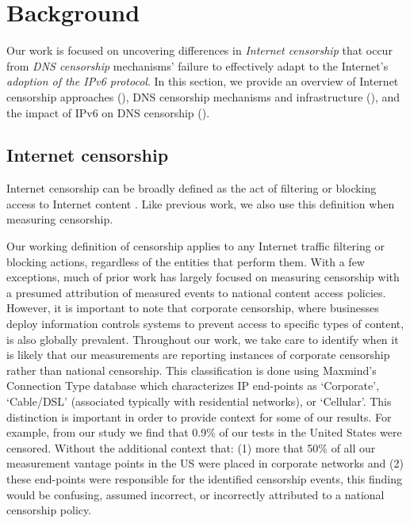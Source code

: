 \section{Background}\label{sec:background}
Our work is focused on uncovering differences in {\em Internet censorship} that occur
from {\em DNS censorship} mechanisms' failure to effectively adapt to the Internet's
{\em adoption of the IPv6 protocol}. In this section, we provide an overview of
Internet censorship approaches (), DNS
censorship mechanisms and infrastructure (), and the
impact of IPv6 on DNS censorship ().

\subsection{Internet censorship}\label{sec:background:censorship}

Internet censorship can be broadly defined as the act of filtering or blocking
access to Internet content \cite{townsend}. Like previous work, we also use
this definition when measuring censorship.

Our working definition of censorship applies to any Internet traffic filtering
or blocking actions, regardless of the entities that perform them. With a few
exceptions, much of prior work has largely focused on measuring censorship with
a presumed attribution of measured events to national content access policies.
However, it is important to note that corporate censorship, where businesses
deploy information controls systems to prevent access to specific types of
content, is also globally prevalent. 
%
Throughout our work, we take care to identify when it is likely that our
measurements are reporting instances of corporate censorship rather than
national censorship.  This classification is done using Maxmind's Connection
Type database \cite{maxmind-connectiondb} which characterizes IP end-points as
`Corporate', `Cable/DSL' (associated typically with residential networks), or
`Cellular'.
%
This distinction is important in order to provide context for some of our
results. For example, from our study we find that 0.9\% of our tests in the
United States were censored. Without the additional context that: (1) more that
50\% of all our measurement vantage points in the US were placed in corporate
networks and (2) these end-points were responsible for the identified
censorship events, this finding would be confusing, assumed incorrect, or
incorrectly attributed to a national censorship policy. 

